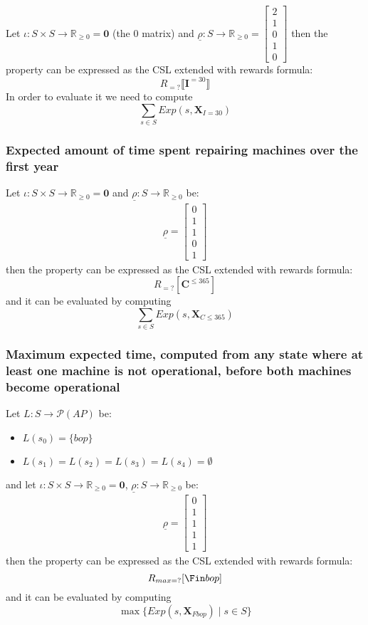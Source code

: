 Let $\iota : S \times S \to \mathbb{R}_{\ge 0} = \mathbf{0}$ (the 0 matrix) and
$\underline{\rho} : S \to \mathbb{R}_{\ge 0} =
	\begin{bmatrix}
		2 \\ 1 \\ 0 \\ 1 \\ 0
	\end{bmatrix}
$
then the property can be expressed as the CSL extended with rewards formula:
\[
	R_{=?}\llbracket \mathbf{I}^{=30} \rrbracket
\]
In order to evaluate it we need to compute
\[
	\sum_{s \in S} Exp(s, \mathbf{X}_{I=30})
\]

\subsubsection*{Expected amount of time spent repairing machines over the first year}

Let $\iota : S \times S \to \mathbb{R}_{\ge 0} = \mathbf{0}$ and
$\underline{\rho} : S \to \mathbb{R}_{\ge 0}$ be:
\begin{align*}
	\underline{\rho} =
	\begin{bmatrix}
		0 \\ 1 \\ 1 \\ 0 \\ 1
	\end{bmatrix}
\end{align*}
then the property can be expressed as the CSL extended with rewards formula:
\[
	R_{=?}[ \mathbf{C}^{\le 365} ]
\]
and it can be evaluated by computing
\[
	\sum_{s \in S} Exp(s, \mathbf{X}_{C\le 365})
\]

\subsubsection*{Maximum expected time, computed from any state where at least one machine is not operational, before both machines become operational}

Let $L : S \to \mathscr{P}(AP)$ be:
\begin{itemize}
	\item $L(s_0) = \{ bop \}$
	\item $L(s_1) = L(s_2) = L(s_3) = L(s_4) = \emptyset$
\end{itemize}
and let $\iota : S \times S \to \mathbb{R}_{\ge 0} = \mathbf{0}$,
$\underline{\rho} : S \to \mathbb{R}_{\ge 0}$ be:
\begin{align*}
	\underline{\rho} =
	\begin{bmatrix}
		0 \\ 1 \\ 1 \\ 1 \\ 1
	\end{bmatrix}
\end{align*}
then the property can be expressed as the CSL extended with rewards formula:
\[
	R_{max=?}[ \Fin bop]
\]
and it can be evaluated by computing
\[
	\max \{ Exp(s, \mathbf{X}_{F bop}) \mid s \in S \}
\]
